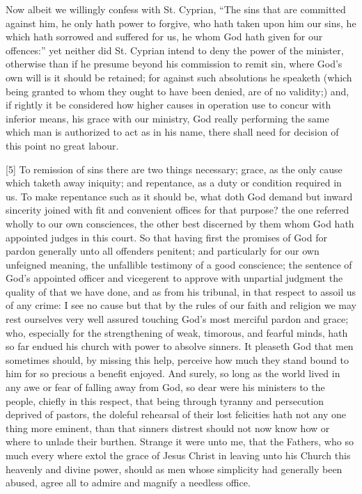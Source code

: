 Now albeit we willingly confess with St. Cyprian, “The sins that are committed against him, he only hath power to forgive, who hath taken upon him our sins, he which hath sorrowed and suffered for us, he whom God hath given for our offences:” yet neither did St. Cyprian intend to deny  the power of the minister, otherwise than if he presume beyond his commission to remit sin, where God’s own will is it should be retained; for against such absolutions he speaketh (which being granted to whom they ought to have been denied, are of no validity;) and, if rightly it be considered how higher causes in operation use to concur with inferior means, his grace with our ministry, God really performing the same which man is authorized to act as in his name, there shall need for decision of this point no great labour.

[5] To remission of sins there are two things necessary; grace, as the only cause which taketh away iniquity; and repentance, as a duty or condition required in us. To make repentance such as it should be, what doth God demand but inward sincerity joined with fit and convenient offices for that purpose? the one referred wholly to our own consciences, the other best discerned by them whom God hath appointed judges in this court. So that having first the promises of God for pardon generally unto all offenders penitent; and particularly for our own unfeigned meaning, the unfallible testimony of a good conscience; the sentence of God’s appointed officer and vicegerent to approve with unpartial judgment the quality of that we have done, and as from his tribunal, in that respect to assoil us of any crime: I see no cause but that by the rules of our faith and religion we may rest ourselves very well assured touching God’s most merciful pardon and grace; who, especially for the strengthening of weak, timorous, and fearful minds, hath so far endued his church with power to absolve sinners. It pleaseth God that men sometimes should, by missing this help, perceive how much they stand bound to him for so precious a benefit enjoyed. And surely, so long as the world lived in any awe or fear of falling away from God, so dear were his ministers to the people, chiefly in this respect, that being through tyranny and persecution deprived of pastors, the doleful rehearsal of  their lost felicities hath not any one thing more eminent, than that sinners distrest should not now know how or where to unlade their burthen. Strange it were unto me, that the Fathers, who so much every where extol the grace of Jesus Christ in leaving unto his Church this heavenly and divine power, should as men whose simplicity had generally been abused, agree all to admire and magnify a needless office.

